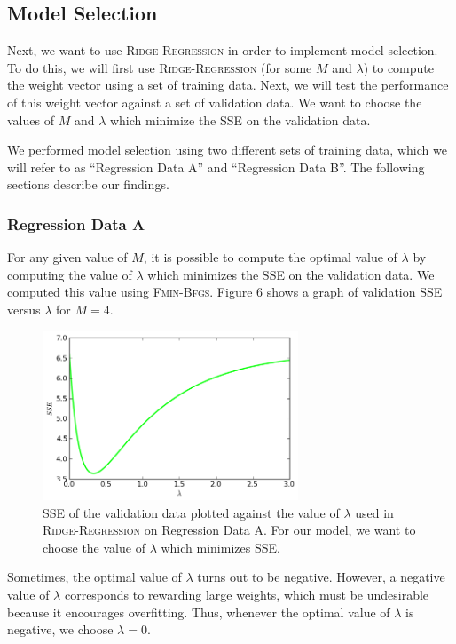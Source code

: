 \documentclass{sigchi}
\begin{document}
\subsection{Model Selection}

Next, we want to use \textsc{Ridge-Regression} in order to implement model selection. To do this, we will first use \textsc{Ridge-Regression}  (for some $M$ and $\lambda$) to compute the weight vector using a set of training data. Next, we will test the performance of this weight vector against a set of validation data. We want to choose the values of $M$ and $\lambda$ which minimize the SSE on the validation data.

We performed model selection using two different sets of training data, which we will refer to as ``Regression Data A'' and ``Regression Data B''. The following sections describe our findings.

\subsubsection{Regression Data A}

For any given value of $M$, it is possible to compute the optimal value of $\lambda$ by computing the value of $\lambda$ which minimizes the SSE on the validation data. We computed this value using \textsc{Fmin-Bfgs}. Figure 6 shows a graph of validation SSE versus $\lambda$ for $M = 4$.

\begin{figure}[!t]
\centering
\includegraphics[width=3in]{min_lam.png}
\caption{SSE of the validation data plotted against the value of $\lambda$ used in \textsc{Ridge-Regression} on Regression Data A. For our model, we want to choose the value of $\lambda$ which minimizes SSE.}
\end{figure}

Sometimes, the optimal value of $\lambda$ turns out to be negative. However, a negative value of $\lambda$ corresponds to rewarding large weights, which must be undesirable because it encourages overfitting. Thus, whenever the optimal value of $\lambda$ is negative, we choose $\lambda = 0$.
\end{document}
